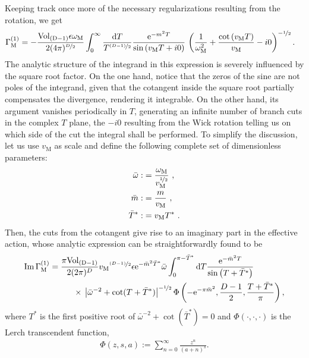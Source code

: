 \documentclass[12pt,a4paper]{article}
\numberwithin{equation}{section}
\numberwithin{equation}{section}
\begin{document}
Keeping track once more of the necessary regularizations resulting from the rotation, we get
\begin{align}
\begin{split}
 \Gamma_\mathrm{M}^{(1)}
 &=-\frac{\mathrm{Vol}_{\mathrm{(D-1)}} \epsilon \omega_\mathrm{M}}{2(4\pi)^{\nicefrac{D}{2}}} \int_0^\infty \frac{{\rm d}T}{T^{\nicefrac{(D-1)}{2}}}
 \frac{\mathrm{e}^{-m^2T}}{\sin{\left( v_\mathrm{M} T + i 0\right)}} \, \left( \frac{1}{\omega_\mathrm{M}^2}+\frac{\cot{( v_\mathrm{M}T)}}{v_\mathrm{M}} -i0 \right)^{-\nicefrac{1}{2}}.
\end{split}
\end{align}
The analytic structure of the integrand in this expression is severely influenced by the square root factor. On the one hand, notice that the zeros of the sine are not poles of the integrand, given that the cotangent inside the square root partially compensates the divergence, rendering it integrable. On the other hand, its argument vanishes periodically in $T$, generating an infinite number of branch cuts in the complex $T$ plane, the $-i0$ resulting from the Wick rotation telling us on which side of the cut the integral shall be performed. 
To simplify the discussion, let us use $v_\mathrm{M}$ as scale and define the following complete set of dimensionless parameters:
\begin{align}
\bar{\omega}:&= \frac{\omega_{\rm M}}{v_\mathrm{M}^{\nicefrac{1}{2}}}\ ,
 \\
\bar{m}:&=\frac{m}{v_\mathrm{M}} \ ,
\\
\bar{T}^*:&= v_\mathrm{M} T^*\ .
\end{align}
Then, the cuts from the cotangent give rise to an imaginary part in the effective action, whose analytic expression can be straightforwardly found to be
\begin{align}
 \begin{split}\label{eq:im_ea_assisted}
\operatorname{Im} \Gamma_\mathrm{M}^{(1)}
 &=\frac{\pi\mathrm{Vol}_{\mathrm{(D-1)}} }{2(2\pi)^{{D}{}} } {v_\mathrm{M}}^{\nicefrac{(D-1)}{2}} \epsilon \mathrm{e}^{-\bar{m}^2 \bar{T}^* } \bar{\omega}
 \int_{0}^{\pi- \bar{T}^*} {\rm d}T \frac{\mathrm{e}^{-\bar{m}^2T}}{\sin{\left( T + \bar{T}^* \right)}}
\\
&\hspace{1cm}\times \, \left| \bar{\omega}^{-2}+\cot(T+\bar{T}^*)\right|^{-\nicefrac{1}{2}} \Phi\left(-\mathrm{e}^{-\pi \bar{m}^2}, \frac{D-1}{2}, \frac{T+\bar{T}^*}{\pi}\right),
 \end{split}
 \end{align}
where $T^*$ is the first positive root of $\bar{\omega}^{-2}+\cot{( \bar{T}^*)}=0$ and
$\Phi(\cdot,\cdot, \cdot)$ is the Lerch transcendent function,
\begin{align}
 \Phi(z,s,a):=\sum_{n=0}^{\infty} \frac{z^n}{(a+n)^s}.
\end{align}
\end{document}

